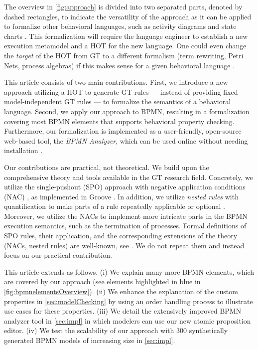 \documentclass{lmcs} %
\begin{document}
The overview in \autoref{fig:approach} is divided into two separated parts, denoted by dashed rectangles, to indicate the versatility of the approach as it can be applied to formalize other behavioral languages, such as activity diagrams and state charts \cite{seidlUMLClassroom2015, objectmanagementgroupUnifiedModelingLanguage2017}.
This formalization will require the language engineer to establish a new execution metamodel and a HOT for the new language.
One could even change the \textit{target} of the HOT from GT to a different formalism (term rewriting, Petri Nets, process algebras) if this makes sense for a given behavioral language \cite{krauterBehavioralConsistencyMultimodeling2023}.

This article consists of two main contributions.
First, we introduce a new approach utilizing a HOT to generate GT rules --- instead of providing fixed model-independent GT rules --- to formalize the semantics of a behavioral language.
Second, we apply our approach to BPMN, resulting in a formalization covering most BPMN elements that supports behavioral property checking.
Furthermore, our formalization is implemented as a user-friendly, open-source web-based tool, the \textit{BPMN Analyzer}, which can be used online without needing installation \cite{timkrauterLMCS2024Artifacts2023}.

Our contributions are practical, not theoretical.
We build upon the comprehensive theory and tools available in the GT research field.
Concretely, we utilize the single-pushout (SPO) approach with negative application conditions (NAC) \cite{ehrigALGEBRAICAPPROACHESGRAPH1997}, as implemented in Groove \cite{rensinkGROOVESimulatorTool2004}.
In addition, we utilize \textit{nested rules} with quantification to make parts of a rule repeatedly applicable or optional \cite{rensinkNestedQuantificationGraph2006,rensinkHowMuchAre2017}.
Moreover, we utilize the NACs to implement more intricate parts in the BPMN execution semantics, such as the termination of processes.
Formal definitions of SPO rules, their application, and the corresponding extensions of the theory (NACs, nested rules) are well-known, see \cite{ehrigALGEBRAICAPPROACHESGRAPH1997,rensinkNestedQuantificationGraph2006}.
We do not repeat them and instead focus on our practical contribution.

This article extends \cite{krauterFormalizationAnalysisBPMN2023} as follows.
(i) We explain many more BPMN elements, which are covered by our approach (see elements highlighted in blue in \autoref{fig:bpmnelementsOverview}).
(ii) We enhance the explanation of the custom properties in \autoref{sec:modelChecking} by using an order handling process to illustrate use cases for these properties.
(iii) We detail the extensively improved BPMN analyzer tool in \autoref{sec:impl} in which modelers can use our new atomic proposition editor.
(iv) We test the scalability of our approach with 300 synthetically generated BPMN models of increasing size in \autoref{sec:impl}. 
\end{document}
